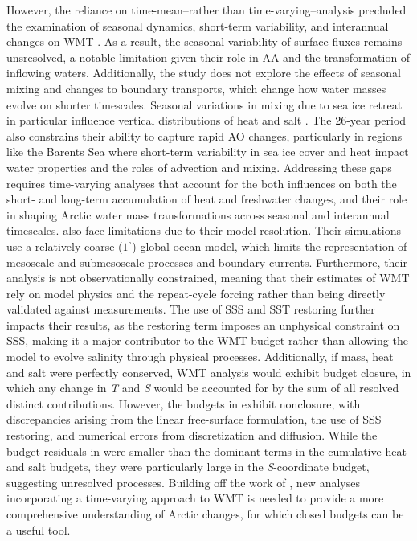 \documentclass[draft]{agujournal2019}
\begin{document}
However, the reliance on time-mean--rather than time-varying--analysis precluded the examination of seasonal dynamics, short-term variability, and interannual changes on WMT \cite{Tsubouchi2018}. As a result, the seasonal variability of surface fluxes remains unsresolved, a notable limitation given their role in AA and the transformation of inflowing waters. Additionally, the study does not explore the effects of seasonal mixing and changes to boundary transports, which change how water masses evolve on shorter timescales. Seasonal variations in mixing due to sea ice retreat in particular influence vertical distributions of heat and salt \cite{Brown2020}. The 26-year period also constrains their ability to capture rapid AO changes, particularly in regions like the Barents Sea where short-term variability in sea ice cover and heat impact water properties and the roles of advection and mixing. Addressing these gaps requires time-varying analyses that account for the both influences on both the short- and long-term accumulation of heat and freshwater changes, and their role in shaping Arctic water mass transformations across seasonal and interannual timescales.  also face limitations due to their model resolution. Their simulations use a relatively coarse ($1^\circ$) global ocean model, which limits the representation of mesoscale and submesoscale processes and boundary currents. Furthermore, their analysis is not observationally constrained, meaning that their estimates of WMT rely on model physics and the repeat-cycle forcing rather than being directly validated against measurements. The use of SSS and SST restoring further impacts their results, as the restoring term imposes an unphysical constraint on SSS, making it a major contributor to the WMT budget rather than allowing the model to evolve salinity through physical processes. Additionally, if mass, heat and salt were perfectly conserved, WMT analysis would exhibit budget closure, in which any change in \emph{T} and \emph{S} would be accounted for by the sum of all resolved distinct contributions. However, the budgets in  exhibit nonclosure, with discrepancies arising from the linear free-surface formulation, the use of SSS restoring, and numerical errors from discretization and diffusion. While the budget residuals in  were smaller than the dominant terms in the cumulative heat and salt budgets, they were particularly large in the \emph{S}-coordinate budget, suggesting unresolved processes. Building off the work of , new analyses incorporating a time-varying approach to WMT is needed to provide a more comprehensive understanding of Arctic changes, for which closed budgets can be a useful tool.
\end{document}
